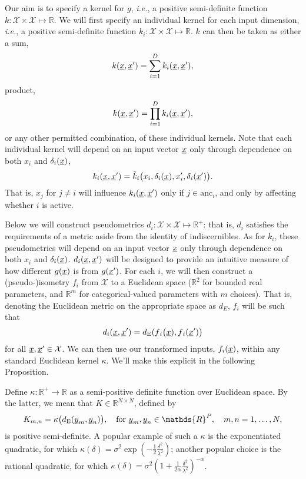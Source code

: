 \documentclass[letterpaper]{article}
\newcommand{\vect}[1]{\underline{\smash{#1}}}
\renewcommand{\v}[1]{\vect{#1}}
\newcommand{\reals}{\mathds{R}}
\newcommand{\sX}{\mathcal{X}}
\begin{document}
Our aim is to specify a kernel for $g$, \emph{i.e.}, a positive semi-definite function  $k\colon \sX \times \sX \mapsto \reals$. We will first specify an individual kernel for each input dimension, \emph{i.e.}, a positive semi-definite function $k_i\colon \sX \times \sX \mapsto \reals$. $k$ can then be taken as either a sum,
\begin{equation}
 k(\v{x}, \v{x}') = \sum_{i=1}^D k_i(\v{x},\v{x}'),
\end{equation}
product,
\begin{equation}
 k(\v{x}, \v{x}') = \prod_{i=1}^D k_i(\v{x},\v{x}'),
\end{equation}
or any other permitted combination, of these individual kernels. Note that each individual kernel will depend on an  input vector $\v{x}$ only through dependence on both $x_i$ and $\delta_i(\v{x})$,
\begin{equation}
  k_i(\v{x},\v{x}') = \tilde{k}_i\bigl(x_i,\delta_i(\v{x}),x_i', \delta_i(\v{x}') \bigr).
\end{equation}
That is, $x_j$ for $j\neq i$ will influence $k_i(\v{x},\v{x}')$ only if $j \in \text{anc}_i$, and only by affecting whether $i$ is active.

Below we will construct pseudometrics $d{_i}\colon \sX \times \sX \mapsto \reals^+$: that is, $d_i$ satisfies the requirements of a metric aside from the identity of indiscernibles. As for $k_i$, these pseudometrics will depend on an input vector $\v{x}$ only through dependence on both $x_i$ and $\delta_i(\v{x})$. $d{_i}(\v{x}, \v{x}')$ will be designed to provide an intuitive measure of how different $g(\v{x})$ is from $g(\v{x}')$. For each $i$, we will then construct a (pseudo-)isometry $f_i$ from
$\sX$ 
to a Euclidean space ($\reals^2$ for bounded real parameters, and $\reals^m$ for categorical-valued parameters with $m$ choices). That is, denoting the Euclidean metric on the appropriate space as $d{_E}$, $f_i$ will be such that
\begin{equation}
 d{_i}(\v{x},\v{x}')
=
d_{\text{E}}(f{_i}\bigl(\v{x}), f{_i}(\v{x}')\bigr)
\end{equation}
for all $\v{x}, \v{x}' \in \sX$. We can then use our transformed inputs, $f_i(\v{x})$, within any standard Euclidean kernel $\kappa$. We'll make this explicit in the following Proposition. 

Define $\kappa\colon \reals^+ \to \reals$ as a semi-positive definite function over Euclidean space. By the latter, we mean that $K \in \reals^{N\times N}$, defined by 
\begin{equation}
 K_{m, n} = \kappa\bigl(d_{\text{E}}(\v{y}_m, \v{y}_n)\bigr),\quad \text{for }
\v{y}_m, \v{y}_n \in \reals^P,\quad m, n = 1, \ldots, N, 
\end{equation}
is positive semi-definite. A popular example of such a $\kappa$ is the exponentiated quadratic, for which $\kappa(\delta) = \sigma^2 \exp(-\frac{1}{2} \frac{\delta^2}{\lambda^2})$; another popular choice is the rational quadratic, for which $\kappa(\delta) = \sigma^2 (1+\frac{1}{2\alpha} \frac{\delta^2}{\lambda^2})^{-\alpha}$.
\end{document}
